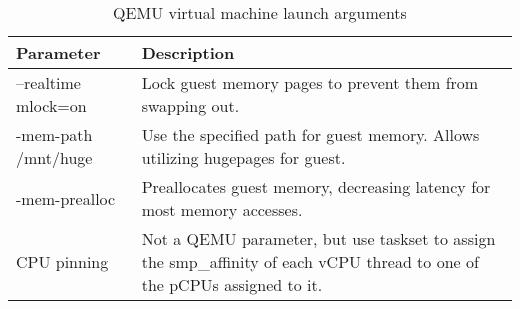 \begin{table}
    \centering
    \caption{QEMU virtual machine launch arguments}
    \label{tab:qemu_params_table}
\begin{tabular}{|l|p{10cm}|}
\hline
Parameter & Description \\
\hline \hline
--realtime mlock=on & Lock guest memory pages to prevent them from swapping out.\\ 
\hline
-mem-path /mnt/huge & Use the specified path for guest memory.  Allows utilizing hugepages for guest.\\
\hline
-mem-prealloc & Preallocates guest memory, decreasing latency for most memory accesses.\\
\hline
CPU pinning & Not a QEMU parameter, but use taskset to assign the smp\_affinity of each vCPU thread to one of the pCPUs assigned to it.\\
\hline
\end{tabular}
\end{table}


